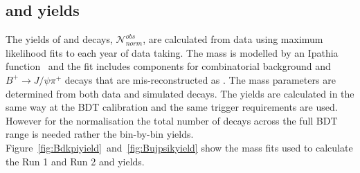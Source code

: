 {{{%



\subsection{\bdkpi and \bujpsik yields}
The yields of \bujpsik and \bdkpi decays, $ \mathcal{N}^{obs}_{norm}$, are calculated from data using maximum likelihood fits to each year of data taking. 
The \bujpsik mass \pdf is modelled by an Ipathia function~\cite{} and the fit includes components for combinatorial background and $B^{+} \to J/\psi \pi^{+}$ decays that are mis-reconstructed as \bujpsik. The mass \pdf parameters are determined from both data and simulated decays. The \bdkpi yields are calculated in the same way at the BDT calibration and the same trigger requirements are used. However for the normalisation the total number of \bdkpi decays across the full BDT range is needed rather the bin-by-bin yields. Figure~\ref{fig:Bdkpiyield}~and~\ref{fig:Bujpsikyield} show the mass fits used to calculate the Run 1 and Run 2 \bdkpi and \bujpsik yields.


}}}
